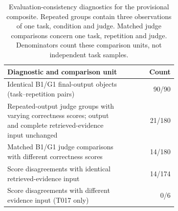 \begin{table}[!htbp]
\centering
\small
\caption[Evaluation-consistency diagnostics]{Evaluation-consistency diagnostics for the provisional composite. Repeated groups contain three observations of one task, condition and judge. Matched judge comparisons concern one task, repetition and judge. Denominators count these comparison units, not independent task samples.}
\label{tab:evaluation-consistency}
\begin{tabular}{p{0.69\linewidth}r}
\toprule
Diagnostic and comparison unit & Count \\
\midrule
Identical B1/G1 final-output objects (task--repetition pairs) & 90/90 \\
Repeated-output judge groups with varying correctness scores;
output and complete retrieved-evidence input unchanged & 21/180 \\
Matched B1/G1 judge comparisons with different correctness scores & 14/180 \\
\midrule
Score disagreements with identical retrieved-evidence input & 14/174 \\
Score disagreements with different evidence input (T017 only) & 0/6 \\
\bottomrule
\end{tabular}
\end{table}
